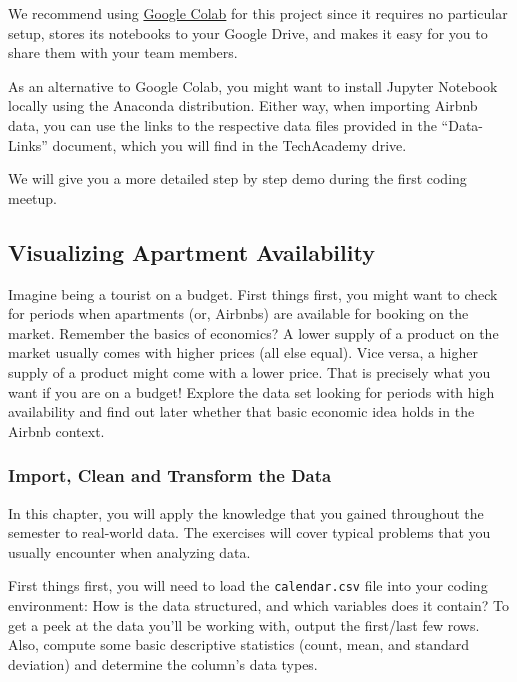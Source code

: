 \documentclass[
  11pt,
]{article}
\newenvironment{tipsp}[1]
  {
  \begin{itemize}
  \footnotesize
  \renewcommand{\labelitemi}{
    \raisebox{-.7\height}[0pt][0pt]{
      {\setkeys{Gin}{width=3em,keepaspectratio}
        \texttt{[image: images/\#1.png]}}
    }
  }
  \setlength{\fboxsep}{1em}
  \begin{pbox}
  \item
  }
  {
  \end{pbox}
  \end{itemize}
  }
\begin{document}
\begin{tipsp}p
We recommend using \href{https://colab.research.google.com}{Google Colab} for this project since it requires no particular setup, stores its notebooks to your Google Drive, and makes it easy for you to share them with your team members.

As an alternative to Google Colab, you might want to install Jupyter Notebook locally using the Anaconda distribution.
Either way, when importing Airbnb data, you can use the links to the respective data files provided in the ``Data-Links'' document, which you will find in the TechAcademy drive.

We will give you a more detailed step by step demo during the first coding meetup.

\end{tipsp}

\hypertarget{visualizing-apartment-availability}{%
\subsection{Visualizing Apartment Availability}\label{visualizing-apartment-availability}}

Imagine being a tourist on a budget. First things first, you might want to check for periods when apartments (or, Airbnbs) are available for booking on the market. Remember the basics of economics? A lower supply of a product on the market usually comes with higher prices (all else equal). Vice versa, a higher supply of a product might come with a lower price. That is precisely what you want if you are on a budget! Explore the data set looking for periods with high availability and find out later whether that basic economic idea holds in the Airbnb context.

\hypertarget{import-clean-and-transform-the-data}{%
\subsubsection{Import, Clean and Transform the Data}\label{import-clean-and-transform-the-data}}

In this chapter, you will apply the knowledge that you gained throughout the semester to real-world data. The exercises will cover typical problems that you usually encounter when analyzing data.

First things first, you will need to load the \texttt{calendar.csv} file into your coding environment: How is the data structured, and which variables does it contain? To get a peek at the data you'll be working with, output the first/last few rows. Also, compute some basic descriptive statistics (count, mean, and standard deviation) and determine the column's data types.
\end{document}
